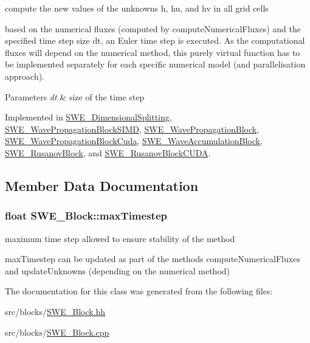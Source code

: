 compute the new values of the unknowns h, hu, and hv in all grid cells 

based on the numerical fluxes (computed by compute\-Numerical\-Fluxes) and the specified time step size dt, an Euler time step is executed. As the computational fluxes will depend on the numerical method, this purely virtual function has to be implemented separately for each specific numerical model (and parallelisation approach). 
\begin{DoxyParams}{Parameters}
{\em dt} & size of the time step \\
\hline
\end{DoxyParams}


Implemented in \hyperlink{classSWE__DimensionalSplitting_af74b527ff9ca7727442db92d2e438531}{S\-W\-E\-\_\-\-Dimensional\-Splitting}, \hyperlink{classSWE__WavePropagationBlockSIMD_a2596238868efd3cdd453d9ac2de15997}{S\-W\-E\-\_\-\-Wave\-Propagation\-Block\-S\-I\-M\-D}, \hyperlink{classSWE__WavePropagationBlock_a1b1422472a36602b34180e4ed27f6d8c}{S\-W\-E\-\_\-\-Wave\-Propagation\-Block}, \hyperlink{classSWE__WavePropagationBlockCuda_a4163045a47a73515841e754ca3859fc5}{S\-W\-E\-\_\-\-Wave\-Propagation\-Block\-Cuda}, \hyperlink{classSWE__WaveAccumulationBlock_a67b78723e81aec6e661b3710e6c41b43}{S\-W\-E\-\_\-\-Wave\-Accumulation\-Block}, \hyperlink{classSWE__RusanovBlock_a2980aa21030ba8fc607001ad817d7454}{S\-W\-E\-\_\-\-Rusanov\-Block}, and \hyperlink{classSWE__RusanovBlockCUDA_a0a18726a733492218423eed37a7ab406}{S\-W\-E\-\_\-\-Rusanov\-Block\-C\-U\-D\-A}.



\subsection{Member Data Documentation}
\hypertarget{classSWE__Block_a05cbc9b40e0483bf73dbc2bdeae7dee3}{
\subsubsection[{max\-Timestep}]{\setlength{\rightskip}{0pt plus 5cm}float S\-W\-E\-\_\-\-Block\-::max\-Timestep\hspace{0.3cm}{\ttfamily [protected]}}}\label{classSWE__Block_a05cbc9b40e0483bf73dbc2bdeae7dee3}


maximum time step allowed to ensure stability of the method 

max\-Timestep can be updated as part of the methods compute\-Numerical\-Fluxes and update\-Unknowns (depending on the numerical method) 

The documentation for this class was generated from the following files\-:\begin{DoxyCompactItemize}
\item 
src/blocks/\hyperlink{SWE__Block_8hh}{S\-W\-E\-\_\-\-Block.\-hh}\item 
src/blocks/\hyperlink{SWE__Block_8cpp}{S\-W\-E\-\_\-\-Block.\-cpp}\end{DoxyCompactItemize}

